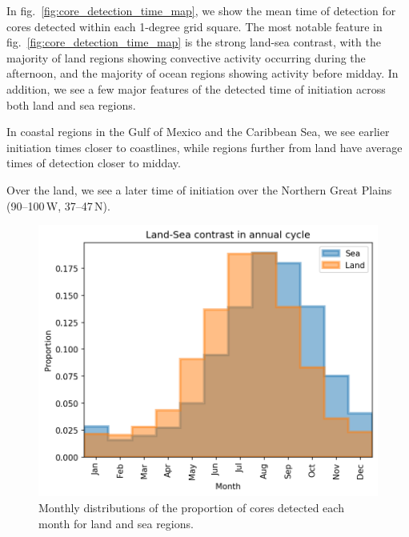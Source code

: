 In fig.~\ref{fig:core_detection_time_map}, we show the mean time of detection for cores detected within each 1-degree grid square.
The most notable feature in fig.~\ref{fig:core_detection_time_map} is the strong land-sea contrast, with the majority of land regions showing convective activity occurring during the afternoon, and the majority of ocean regions showing activity before midday.
In addition, we see a few major features of the detected time of initiation across both land and sea regions.

In coastal regions in the Gulf of Mexico and the Caribbean Sea, we see earlier initiation times closer to coastlines, while regions further from land have average times of detection closer to midday.


Over the land, we see a later time of initiation over the Northern Great Plains (90--100\,\textdegree W, 37--47\,\textdegree N).


\begin{figure}[tp]
    \centering
    \includegraphics[width=\textwidth]{figures/ch2_land_sea_monthly.png}
    \caption[
    Monthly distributions of the proportion of cores detected each month for land and sea regions
    ]{
    Monthly distributions of the proportion of cores detected each month for land and sea regions.
    }
    \label{fig:core_annual_land_sea}
\end{figure}


